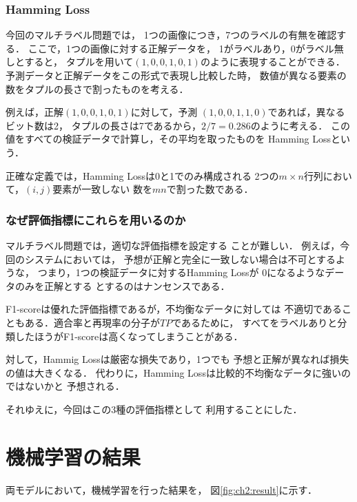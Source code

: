 \subsubsection{Hamming Loss}
今回のマルチラベル問題では，
1つの画像につき，7つのラベルの有無を確認する．
ここで，1つの画像に対する正解データを，
1がラベルあり，0がラベル無しとすると，
タプルを用いて$(1,0,0,1,0,1)$のように表現することができる．
予測データと正解データをこの形式で表現し比較した時，
数値が異なる要素の数をタプルの長さで割ったものを考える．

例えば，正解$(1,0,0,1,0,1)$に対して，予測
$(1,0,0,1,1,0)$であれば，異なるビット数は2，
タプルの長さは7であるから，$2/7 = 0.286$のように考える．
この値をすべての検証データで計算し，その平均を取ったものを
Hamming Lossという．

正確な定義では，Hamming Lossは0と1でのみ構成される
2つの$m \times n$行列において，$(i,j)$要素が一致しない
数を$mn$で割った数である．
\subsubsection{なぜ評価指標にこれらを用いるのか}
マルチラベル問題では，適切な評価指標を設定する
ことが難しい．
例えば，今回のシステムにおいては，
予想が正解と完全に一致しない場合は不可とするような，
つまり，1つの検証データに対するHamming Lossが
0になるようなデータのみを正解とする
とするのはナンセンスである．

F1-scoreは優れた評価指標であるが，不均衡なデータに対しては
不適切であることもある．適合率と再現率の分子が$TP$であるために，
すべてをラベルありと分類したほうがF1-scoreは高くなってしまうことがある．

対して，Hammig Lossは厳密な損失であり，1つでも
予想と正解が異なれば損失の値は大きくなる．
代わりに，Hamming Lossは比較的不均衡なデータに強いのではないかと
予想される．

それゆえに，今回はこの3種の評価指標として
利用することにした．
\section{機械学習の結果}
両モデルにおいて，機械学習を行った結果を，
図\ref{fig:ch2:result}に示す．

